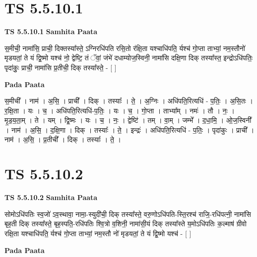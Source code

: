 \documentclass[17pt]{extarticle}
\begin{document}
\section*{ TS 5.5.10.1 }

\textbf{TS 5.5.10.1 } \newline
\textbf{Samhita Paata} \newline

स॒॒मीची॒॒ नामा॑सि॒ प्राची॒ दिक्तस्या᳚स्ते॒ ऽग्निरधि॑पति रसि॒तो र॑क्षि॒ता यश्चाधि॑पति॒ र्यश्च॑ गो॒प्ता ताभ्यां॒ नम॒स्तौनो॑ मृडयतां॒ ते यं द्वि॒ष्मो यश्च॑ नो॒ द्वेष्टि॒ तं ॅवां॒ जंभे॑ दधाम्योज॒स्विनी॒ नामा॑सि दक्षि॒णा दिक् तस्या᳚स्त॒ इन्द्रोऽधि॑पतिः॒ पृदा॑कुः॒ प्राची॒ नामा॑सि प्र॒तीची॒ दिक् तस्या᳚स्ते॒ - [  ] \newline

\textbf{Pada Paata} \newline

स॒मीची᳚ । नाम॑ । अ॒सि॒ । प्राची᳚ । दिक् । तस्याः᳚ । ते॒ । अ॒ग्निः । अधि॑पति॒रित्यधि॑ - प॒तिः॒ । अ॒सि॒तः । र॒क्षि॒ता । यः । च॒ । अधि॑पति॒रित्यधि॑-प॒तिः॒ । यः । च॒ । गो॒प्ता । ताभ्या᳚म् । नमः॑ । तौ । नः॒ । मृ॒ड॒य॒ता॒म् । ते । यम् । द्वि॒ष्मः । यः । च॒ । नः॒ । द्वेष्टि॑ । तम् । वा॒म् । जम्भे᳚ । द॒धा॒मि॒ । ओ॒ज॒स्विनी᳚ । नाम॑ । अ॒सि॒ । द॒क्षि॒णा । दिक् । तस्याः᳚ । ते॒ । इन्द्रः॑ । अधि॑पति॒रित्यधि॑ - प॒तिः॒ । पृदा॑कुः । प्राची᳚ । नाम॑ । अ॒सि॒ । प्र॒तीची᳚ । दिक् । तस्याः᳚ । ते॒ ।  \newline




\section*{ TS 5.5.10.2 }

\textbf{TS 5.5.10.2 } \newline
\textbf{Samhita Paata} \newline

सोमोऽधि॑पतिः स्व॒जो॑ ऽव॒स्थावा॒ नामा॒-स्युदी॑ची॒ दिक् तस्या᳚स्ते॒ वरु॒णोऽधि॑पति-स्ति॒रश्च॑ राजि॒-रधि॑पत्नी॒ नामा॑सि बृह॒ती दिक् तस्या᳚स्ते॒ बृह॒स्पति॒-रधि॑पतिः श्वि॒त्रो व॒शिनी॒ नामा॑सी॒यं दिक् तस्या᳚स्ते य॒मोऽधि॑पतिः क॒ल्माष॑ ग्रीवो रक्षि॒ता यश्चाधि॑पति॒ र्यश्च॑ गो॒प्ता ताभ्यां॒ नम॒स्तौ नो॑ मृडयतां॒ ते यं द्वि॒ष्मो यश्च॑ - [  ] \newline

\textbf{Pada Paata} \newline
\end{document}
